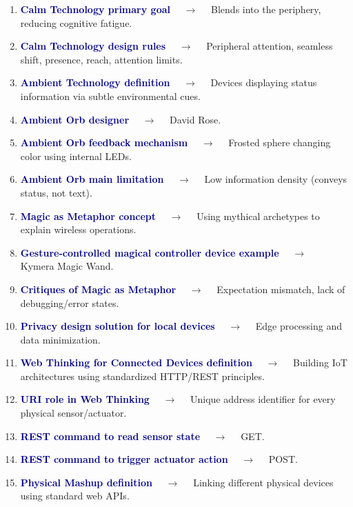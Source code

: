 \documentclass[11pt,a4paper]{article}
\begin{document}
\begin{enumerate}[label=\arabic*., leftmargin=*, labelsep=0.8em, itemsep=0.35em, parsep=0.1em, topsep=0.2em]
  \item \textcolor{darkblue}{\textbf{Calm Technology primary goal}} $\quad\to\quad$ Blends into the periphery, reducing cognitive fatigue.
  \item \textcolor{darkblue}{\textbf{Calm Technology design rules}} $\quad\to\quad$ Peripheral attention, seamless shift, presence, reach, attention limits.
  \item \textcolor{darkblue}{\textbf{Ambient Technology definition}} $\quad\to\quad$ Devices displaying status information via subtle environmental cues.
  \item \textcolor{darkblue}{\textbf{Ambient Orb designer}} $\quad\to\quad$ David Rose.
  \item \textcolor{darkblue}{\textbf{Ambient Orb feedback mechanism}} $\quad\to\quad$ Frosted sphere changing color using internal LEDs.
  \item \textcolor{darkblue}{\textbf{Ambient Orb main limitation}} $\quad\to\quad$ Low information density (conveys status, not text).
  \item \textcolor{darkblue}{\textbf{Magic as Metaphor concept}} $\quad\to\quad$ Using mythical archetypes to explain wireless operations.
  \item \textcolor{darkblue}{\textbf{Gesture-controlled magical controller device example}} $\quad\to\quad$ Kymera Magic Wand.
  \item \textcolor{darkblue}{\textbf{Critiques of Magic as Metaphor}} $\quad\to\quad$ Expectation mismatch, lack of debugging/error states.
  \item \textcolor{darkblue}{\textbf{Privacy design solution for local devices}} $\quad\to\quad$ Edge processing and data minimization.
  \item \textcolor{darkblue}{\textbf{Web Thinking for Connected Devices definition}} $\quad\to\quad$ Building IoT architectures using standardized HTTP/REST principles.
  \item \textcolor{darkblue}{\textbf{URI role in Web Thinking}} $\quad\to\quad$ Unique address identifier for every physical sensor/actuator.
  \item \textcolor{darkblue}{\textbf{REST command to read sensor state}} $\quad\to\quad$ GET.
  \item \textcolor{darkblue}{\textbf{REST command to trigger actuator action}} $\quad\to\quad$ POST.
  \item \textcolor{darkblue}{\textbf{Physical Mashup definition}} $\quad\to\quad$ Linking different physical devices using standard web APIs.

\end{enumerate}
\end{document}
